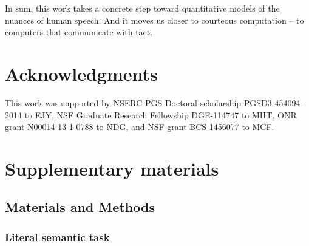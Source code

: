 \documentclass[12pt]{article}
\newcommand{\ejy}[1]{\textcolor{Red}{[ejy: #1]}}
\begin{document}
In sum, this work takes a concrete step toward quantitative models of
the nuances of human speech. And it moves us closer to courteous
computation -- to computers that communicate with tact.












\section*{Acknowledgments}
This work was supported by NSERC PGS Doctoral scholarship
PGSD3-454094-2014 to EJY, NSF Graduate Research Fellowship DGE-114747 to
MHT, ONR grant N00014-13-1-0788 to NDG, and NSF grant BCS 1456077 to
MCF.


\section*{Supplementary materials}


\subsection*{Materials and Methods}\label{materials-and-methods}

\subsubsection*{Literal semantic task}\label{literal-semantic-task}
\end{document}
